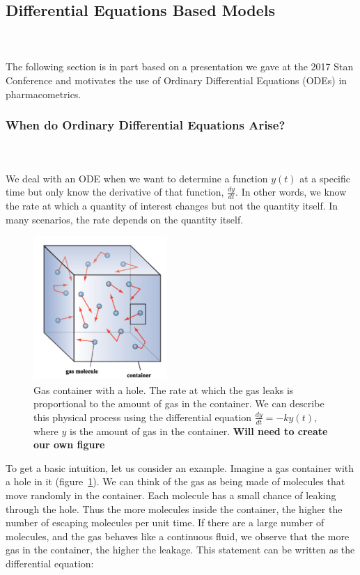 \documentclass[11pt]{amsart}
\begin{document}
\subsection{Differential Equations Based Models} \ \\ \ \\
The following section is in part based on a presentation we gave at the 2017 Stan Conference \cite{StanCon2017} and motivates the use of Ordinary Differential Equations (ODEs) in pharmacometrics.

\subsubsection{When do Ordinary Differential Equations Arise?} \ \\ \ \\
We deal with an ODE when we want to determine a function $y(t)$ at a specific time but only know the derivative of that function, $\frac{dy}{dt}$. In other words, we know the rate at which a quantity of interest changes but not the quantity itself. In many scenarios, the rate depends on the quantity itself.

\begin{figure}[!htb]
\begin{center}
\includegraphics[width=2.0in,trim=0in 0in 0 0in]{graphics/appendix/gas-container.png}
\caption{{Gas container with a hole. The rate at which the gas leaks is proportional to the amount of gas in the container. We can describe this physical process using the differential equation $ \frac{dy}{dt} = -ky(t)$, where $y$ is the amount of gas in the container. \textbf{Will need to create our own figure}}}
\label{GasContainer}
\end{center}
\end{figure}

To get a basic intuition, let us consider an example. Imagine a gas container with a hole in it  (figure~\ref{GasContainer}). We can think of the gas as being made of molecules that move randomly in the container. Each molecule has a small chance of leaking through the hole. Thus the more molecules inside the container, the higher the number of escaping molecules per unit time. If there are a large number of molecules, and the gas behaves like a continuous fluid, we observe that the more gas in the container, the higher the leakage. This statement can be written as the differential equation:
\end{document}
